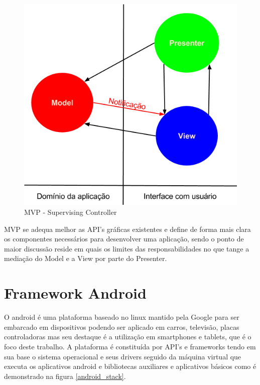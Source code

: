 \begin{figure}[htb]
	\caption{\label{fig:sup_controller} MVP - Supervising Controller}
	\begin{center}
		\includegraphics[scale=0.5]{img/supervising_controller.png}
	\end{center}
\end{figure}

MVP se adequa melhor as API's gráficas existentes e define de forma mais clara
os componentes necessários para desenvolver uma aplicação, sendo o ponto de maior
discussão reside em quais os limites das responsabilidades no que tange a
mediação do Model e a View por parte do Presenter.

\section{Framework Android}
 
O android é uma plataforma baseado no linux mantido pela Google para
ser embarcado em dispositivos podendo ser aplicado em carros, televisão, placas
controladoras mas seu destaque é a utilização em smartphones e
tablets, que é o foco deste trabalho. A plataforma é constituída por API's e
frameworks tendo em sua base o sistema operacional e seus drivers seguido da
máquina virtual que executa os aplicativos android e bibliotecas auxiliares e
aplicativos básicos como é demonstrado na figura \ref{android_stack}.

